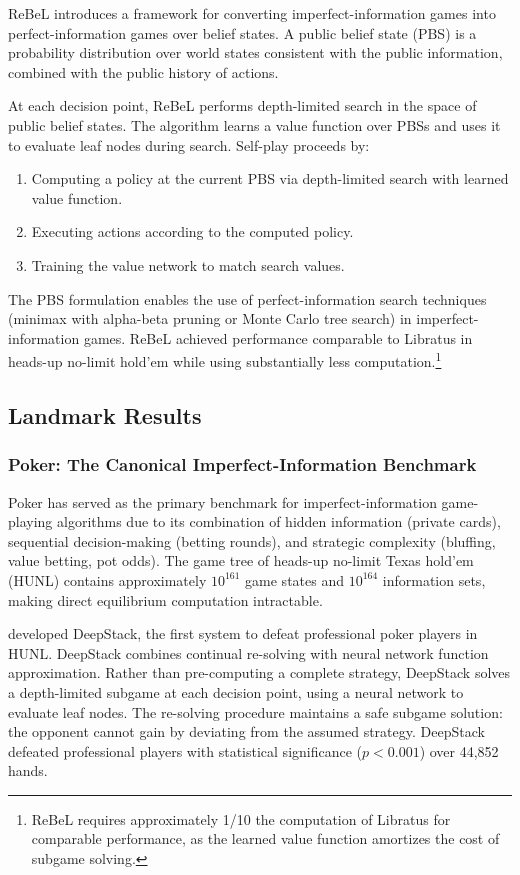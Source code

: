 ReBeL \citep{brown2020combining} introduces a framework for converting imperfect-information games into perfect-information games over belief states. A public belief state (PBS) is a probability distribution over world states consistent with the public information, combined with the public history of actions.

At each decision point, ReBeL performs depth-limited search in the space of public belief states. The algorithm learns a value function over PBSs and uses it to evaluate leaf nodes during search. Self-play proceeds by:
\begin{enumerate}
    \item Computing a policy at the current PBS via depth-limited search with learned value function.
    \item Executing actions according to the computed policy.
    \item Training the value network to match search values.
\end{enumerate}

The PBS formulation enables the use of perfect-information search techniques (minimax with alpha-beta pruning or Monte Carlo tree search) in imperfect-information games. ReBeL achieved performance comparable to Libratus in heads-up no-limit hold'em while using substantially less computation.\footnote{ReBeL requires approximately 1/10 the computation of Libratus for comparable performance, as the learned value function amortizes the cost of subgame solving.}

\subsection{Landmark Results}

\subsubsection{Poker: The Canonical Imperfect-Information Benchmark}

Poker has served as the primary benchmark for imperfect-information game-playing algorithms due to its combination of hidden information (private cards), sequential decision-making (betting rounds), and strategic complexity (bluffing, value betting, pot odds). The game tree of heads-up no-limit Texas hold'em (HUNL) contains approximately $10^{161}$ game states and $10^{164}$ information sets, making direct equilibrium computation intractable.

\citet{moravcik2017} developed DeepStack, the first system to defeat professional poker players in HUNL. DeepStack combines continual re-solving with neural network function approximation. Rather than pre-computing a complete strategy, DeepStack solves a depth-limited subgame at each decision point, using a neural network to evaluate leaf nodes. The re-solving procedure maintains a safe subgame solution: the opponent cannot gain by deviating from the assumed strategy. DeepStack defeated professional players with statistical significance ($p < 0.001$) over 44,852 hands.

